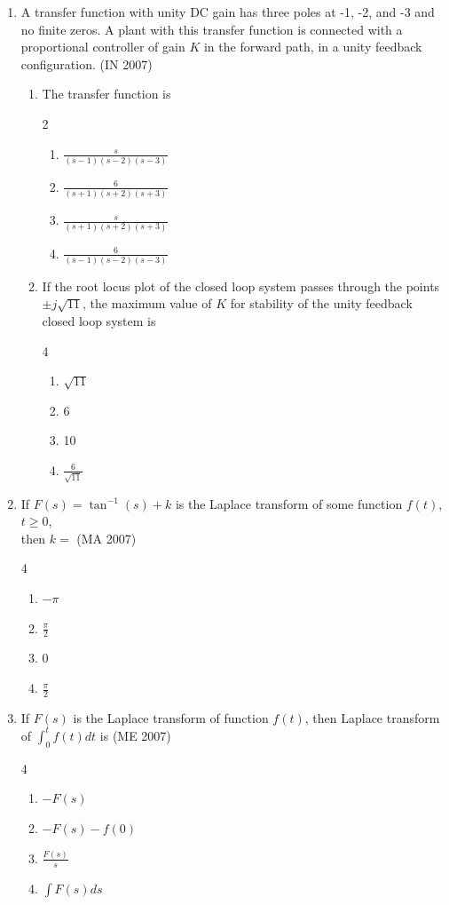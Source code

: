 \begin{enumerate}[label=\thesubsection.\arabic*,ref=\thesubsection.\theenumi]
\item A transfer function with unity DC gain has three poles at -1, -2, and -3 and no finite zeros. A plant with this transfer function is connected with a proportional controller of gain $K$ in the forward path, in a unity feedback configuration.  
\hfill(IN 2007)
\begin{enumerate}
\item The transfer function is
\begin{multicols}{2}
\begin{enumerate}
\item $\frac{s}{(s-1)(s-2)(s-3)}$
\item $\frac{6}{(s+1)(s+2)(s+3)}$
\item $\frac{s}{(s+1)(s+2)(s+3)}$
\item $\frac{6}{(s-1)(s-2)(s-3)}$
\end{enumerate}
\end{multicols}

\item If the root locus plot of the closed loop system passes through the points $\pm j\sqrt{11}$, the maximum value of $K$ for stability of the unity feedback closed loop system is
\begin{multicols}{4}
\begin{enumerate}
\item $\sqrt{11}$  
\item 6  
\item 10  
\item $\frac{6}{\sqrt{11}}$  
\end{enumerate}
\end{multicols}

\end{enumerate}
\item If $F(s) = \tan^{-1}(s) + k$ is the Laplace transform of some function  $f(t)$, $t \ge 0$, \\then $k =$   \hfill (MA 2007)
\begin{multicols}{4}
\begin{enumerate}
    \item $-\pi$
    \item $\frac{\pi}{2}$
    \item $0$
    \item $\frac{\pi}{2}$ 
\end{enumerate}
\end{multicols}
\item If $ F(s) $ is the Laplace transform of function $ f(t) $, then Laplace transform of $ \int_0^t f(t) dt $ is
\hfill (ME 2007)
\begin{multicols}{4}
\begin{enumerate}
\item $ -F(s) $
\item $ -F(s) - f(0) $
\item $ \frac{F(s)}{s} $
\item $ \int F(s) ds $
\end{enumerate}
\end{multicols}


\end{enumerate}
